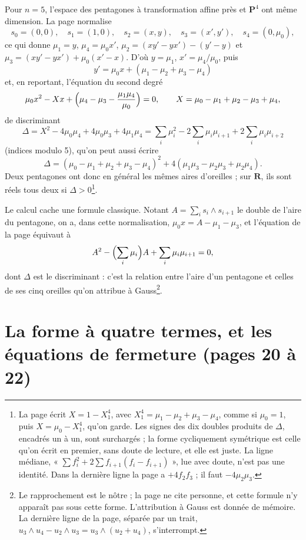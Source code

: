 \documentclass[11pt,a4paper]{article}
\begin{document}
Pour $n = 5$, l'espace des pentagones à transformation affine près et
$\mathbf{P}^4$ ont même dimension. La page normalise
\[
  s_0 = (0,0), \quad s_1 = (1,0), \quad s_2 = (x, y), \quad
  s_3 = (x', y'), \quad s_4 = (0, \mu_0),
\]
ce qui donne $\mu_1 = y$, $\mu_4 = \mu_0 x'$,
$\mu_2 = (x y' - y x') - (y' - y)$ et $\mu_3 = (x y' - y x') + \mu_0 (x' - x)$.
D'où $y = \mu_1$, $x' = \mu_4/\mu_0$, puis
\[
  y' = \mu_0 x + (\mu_1 - \mu_2 + \mu_3 - \mu_4)
\]
et, en reportant, l'équation du second degré
\[
  \mu_0 x^2 - X x + \Bigl( \mu_4 - \mu_3 - \frac{\mu_1 \mu_4}{\mu_0} \Bigr) = 0 ,
  \qquad X = \mu_0 - \mu_1 + \mu_2 - \mu_3 + \mu_4 ,
\]
de discriminant
\[
  \Delta = X^2 - 4\mu_0\mu_4 + 4\mu_0\mu_3 + 4\mu_1\mu_4
  = \sum_i \mu_i^2 - 2 \sum_i \mu_i \mu_{i+1} + 2 \sum_i \mu_i \mu_{i+2}
\]
(indices modulo 5), qu'on peut aussi écrire
\[
  \Delta = (\mu_0 - \mu_1 + \mu_2 + \mu_3 - \mu_4)^2
  + 4 (\mu_1 \mu_3 - \mu_2 \mu_3 + \mu_2 \mu_4) .
\]
Deux pentagones ont donc en général les mêmes aires d'oreilles ; sur
$\mathbf{R}$, ils sont réels tous deux si $\Delta > 0$\footnote{La page
écrit $X = 1 - X_1^4$, avec $X_1^4 = \mu_1 - \mu_2 + \mu_3 - \mu_4$, comme si
$\mu_0 = 1$, puis $X = \mu_0 - X_1^4$, qu'on garde. Les signes des dix doubles
produits de $\Delta$, encadrés un à un, sont surchargés ; la forme
cycliquement symétrique est celle qu'on écrit en premier, sans doute de
lecture, et elle est juste. La ligne médiane,
« $\sum f_i^2 + 2 \sum f_{i+1}(f_i - f_{i+1})$ », lue avec doute, n'est pas
une identité. Dans la dernière ligne la page a $+4 f_2 f_3$ ; il faut
$-4\mu_2\mu_3$.}.

Le calcul cache une formule classique. Notant $A = \sum_i s_i \wedge s_{i+1}$
le double de l'aire du pentagone, on a, dans cette normalisation,
$\mu_0 x = A - \mu_1 - \mu_3$, et l'équation de la page équivaut à
\[
  A^2 - \Bigl( \sum_i \mu_i \Bigr) A + \sum_i \mu_i \mu_{i+1} = 0 ,
\]
dont $\Delta$ est le discriminant : c'est la relation entre l'aire d'un
pentagone et celles de ses cinq oreilles qu'on attribue à Gauss\footnote{Le
rapprochement est le nôtre ; la page ne cite personne, et cette formule n'y
apparaît pas sous cette forme. L'attribution à Gauss est donnée de mémoire. La
dernière ligne de la page, séparée par un trait,
$u_3 \wedge u_4 - u_2 \wedge u_3 = u_3 \wedge (u_2 + u_4)$, s'interrompt.}.

\section*{La forme à quatre termes, et les équations de fermeture (pages 20 à 22)}
\end{document}
